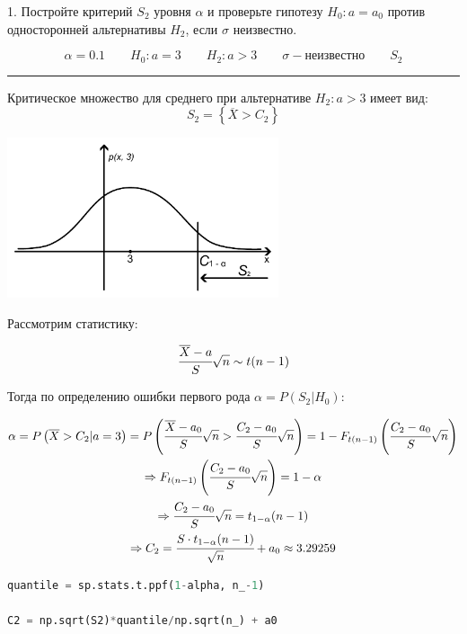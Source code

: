 \documentclass[a4paper, 14pt]{extarticle}
\begin{document}
1. Постройте критерий $S_2$ уровня $\alpha$ и проверьте гипотезу $H_0: a = a_0$ 
против односторонней альтернативы $H_2$, если  $\sigma$ неизвестно.

\begin{equation*}
    \alpha = 0.1 \qquad H_0: a = 3 \qquad H_2: a > 3 \qquad \sigma - \text{неизвестно} \qquad S_2
\end{equation*}

\rule{\linewidth}{0.1mm}

Критическое множество для среднего при альтернативе $H_2: a > 3$ имеет вид:
\begin{equation*}
    S_2 = \left\{ \overline{X} > C_2 \right\}
\end{equation*}

\begin{center}
    \includegraphics[width=0.6\textwidth]{hypo_plot}
\end{center}

Рассмотрим статистику:

\begin{equation*}
    \cfrac{\overline{X} - a}{S} \sqrt{n} \sim t(n-1)
\end{equation*}

Тогда по определению ошибки первого рода $\alpha = P(S_2 | H_0)$:

\begin{gather*}
    \alpha = P\left(\overline{X} > C_2 | a = 3\right) = 
    P\left(\cfrac{\overline{X} - a_0}{S} \sqrt{n} > 
    \cfrac{C_2 - a_0}{S} \sqrt{n}\right)
    = 1 - F_{t(n-1)} \left(\cfrac{C_2 - a_0}{S} \sqrt{n}\right) \\
    \Rightarrow F_{t(n-1)} \left( \cfrac{C_2 - a_0}{S} \sqrt{n} \right) = 1 - \alpha \\
    \Rightarrow \cfrac{C_2 - a_0}{S} \sqrt{n} = t_{1 - \alpha} (n-1) \\
    \Rightarrow C_2 = \cfrac{S \cdot t_{1-\alpha}(n-1)}{\sqrt{n}} + a_0 \approx 3.29259 
\end{gather*}

\begin{center}
    \begin{lstlisting}[language=Python]
quantile = sp.stats.t.ppf(1-alpha, n_-1)

C2 = np.sqrt(S2)*quantile/np.sqrt(n_) + a0
    \end{lstlisting}
\end{center}
\end{document}
